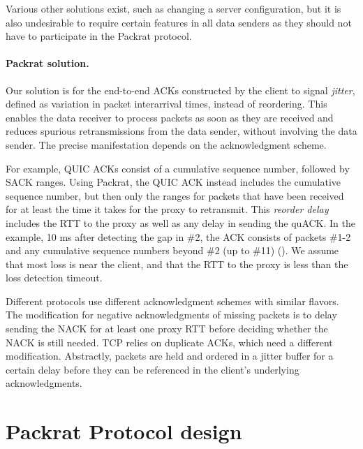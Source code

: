Various other solutions exist, such as changing a server configuration, but it
is also undesirable to require certain features in all data senders as they
should not have to participate in the Packrat protocol.

\paragraph{Packrat solution.}

Our solution is for the end-to-end ACKs constructed by the client to
signal \textit{jitter}, defined as variation in packet interarrival times,
instead of reordering. This enables the data receiver to process packets as
soon as they are received and reduces spurious retransmissions from the data
sender, without involving the data sender. The precise manifestation depends on
the acknowledgment scheme.

For example, QUIC ACKs consist of a cumulative sequence number, followed by SACK
ranges. Using Packrat, the QUIC ACK instead includes the cumulative sequence
number, but then only the ranges for packets that have been received for at
least the time it takes for the proxy to retransmit. This
\textit{reorder delay} includes the RTT to the proxy
as well as any delay in sending the quACK.
In the example, 10 ms after detecting the gap in \#2, the ACK consists
of packets \#1-2 and any cumulative sequence numbers beyond \#2 (up to \#11)
().
We assume
that most loss is near the client, and that the RTT to the proxy is less than
the loss detection timeout.

Different protocols use different acknowledgment schemes with similar flavors.
The modification for negative acknowledgments of missing packets is to delay
sending the NACK for at least one proxy RTT before deciding whether the NACK is
still needed. TCP relies on duplicate ACKs, which need a different
modification. Abstractly, packets are held and ordered in a jitter buffer for a
certain delay before they can be referenced in the client's underlying
acknowledgments.

\section{Packrat Protocol design}
\label{sec:packrat:protocol}

